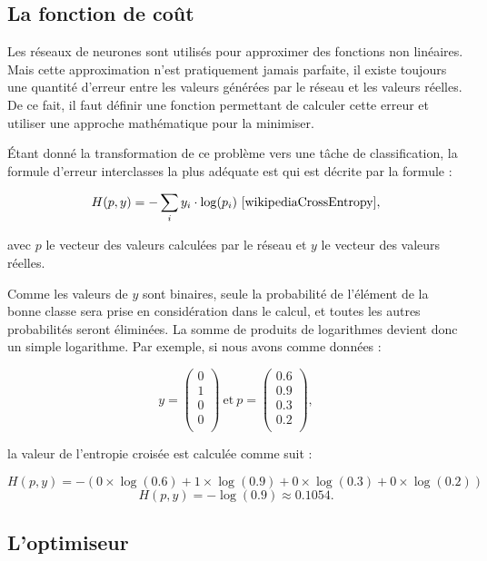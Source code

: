 \subsection{La fonction de coût}

Les réseaux de neurones sont utilisés pour approximer des fonctions non linéaires.
Mais cette approximation n'est pratiquement jamais parfaite, il existe toujours
une quantité d'erreur entre les valeurs générées par le réseau et les valeurs réelles.
De ce fait, il faut définir une fonction permettant de calculer cette erreur et utiliser
une approche mathématique pour la minimiser.

Étant donné la transformation de ce problème vers une tâche de classification,
la formule d'erreur interclasses la plus adéquate est 
qui est décrite par la formule :

$$
H(p, y) = -\sum_i y_i \cdot \log(p_i)~\cite{wikipediaCrossEntropy},
$$

avec $p$ le vecteur des valeurs calculées par le réseau et $y$ le vecteur des valeurs réelles.

Comme les valeurs de $y$ sont binaires, seule la probabilité de l'élément de
la bonne classe sera prise en considération dans le calcul, et toutes les autres
probabilités seront éliminées. La somme de produits de logarithmes devient
donc un simple logarithme.
Par exemple, si nous avons comme données :

$$
y =
\begin{pmatrix}
  0\\
  1\\
  0\\
  0\\
\end{pmatrix}
~
\mathrm{et}
~
p =
\begin{pmatrix}
  0.6\\
  0.9\\
  0.3\\
  0.2\\
\end{pmatrix},
$$

la valeur de l'entropie croisée est calculée comme suit :

$$
H(p, y) = -(0 \times \log(0.6) + 1 \times \log(0.9) + 0 \times \log(0.3) + 0 \times \log(0.2))
$$
$$
H(p, y) = -\log(0.9) \approx 0.1054.
$$

\subsection{L'optimiseur}

